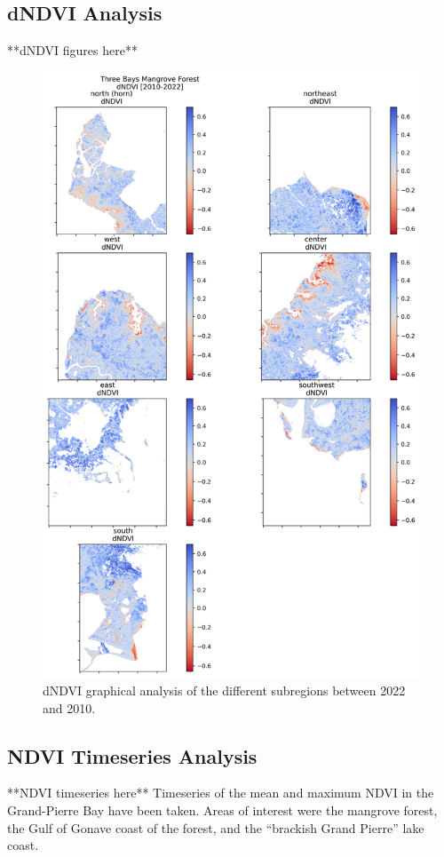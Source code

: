 \documentclass[journal,article,submit,pdftex,moreauthors]{Definitions/mdpi}
\begin{document}
\subsection{dNDVI Analysis}
**dNDVI figures here**
\begin{figure}[H]
\includegraphics[width=13.5 cm]{Figures/mangrove_ndvi.png}
\caption{dNDVI graphical analysis of the different subregions between 2022 and 2010. \label{fig3}}
\end{figure}  

\subsection{NDVI Timeseries Analysis}
**NDVI timeseries here**
Timeseries of the mean and maximum NDVI in the Grand-Pierre Bay have been taken. Areas of interest were the mangrove forest, the Gulf of Gonave coast of the forest, and the “brackish Grand Pierre” lake coast. 
\end{document}
